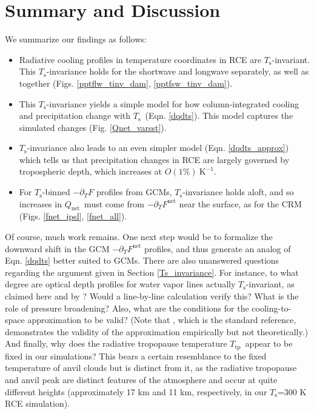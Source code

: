 \documentclass[9pt,twocolumn,twoside,lineno]{pnas-new}
\newcommand{\ppt}{\ensuremath{\partial_T}}
\newcommand{\Qnet}{\ensuremath{Q_\mathrm{net}}}
\newcommand{\Fnet}{\ensuremath{F^\mathrm{net}}}
\newcommand{\Kinverse}{\ensuremath{\mathrm{K^{-1}}}}
\newcommand{\Ts}{\ensuremath{T_\mathrm{s}}}
\newcommand{\Ttp}{\ensuremath{T_\mathrm{tp}}}
\begin{document}
\section{Summary and Discussion}
\label{sec_summary}
We summarize our findings as follows:
	\begin{itemize}
		\item Radiative cooling profiles in temperature coordinates in RCE are  \Ts-invariant. This \Ts-invariance holds for the shortwave and longwave separately, as well as together (Figs. \ref{pptflw_tinv_dam}, \ref{pptfsw_tinv_dam}).
		\item This \Ts-invariance yields a simple model for how column-integrated cooling and  precipitation change with \Ts\ (Eqn. \ref{dqdts}). This model captures the simulated changes (Fig. \ref{Qnet_varsst}).
		\item \Ts-invariance also leads to an even simpler model (Eqn. \ref{dqdts_approx}) which tells us that precipitation changes in RCE are largely governed by tropospheric depth, which increases at $O(1\%)\ \Kinverse$.
		\item For \Ts-binned $-\ppt F$ profiles from GCMs, \Ts-invariance holds aloft, and so increases in \Qnet\ must come from $-\ppt\Fnet$ near the surface, as for the CRM (Figs. \ref{fnet_ipsl}, \ref{fnet_all}).
	\end{itemize}
		
 Of course, much work remains. One next step would be to formalize the downward shift in the GCM $-\ppt\Fnet$ profiles, and thus generate an analog of Eqn. \ref{dqdts} better suited to GCMs. There are also unanswered questions regarding the  argument given in Section \ref{Ts_invariance}. For instance, to what degree are optical depth profiles for water vapor lines actually \Ts-invariant, as claimed here and by \cite{ingram2010}? Would a line-by-line calculation verify this? What is the role of pressure broadening? Also, what are the conditions for the cooling-to-space approximation to be valid? (Note that \cite{rodgers1966}, which is the standard reference, demonstrates the validity of the approximation empirically but not theoretically.) And finally, why does  the radiative tropopause temperature \Ttp\ appear to be fixed in our simulations? This bears a certain resemblance to the fixed temperature of anvil clouds  but is distinct from it, as the radiative tropopause and anvil peak are distinct features of the atmosphere and occur at quite different heights (approximately 17 km and 11 km, respectively, in our \Ts=300 K RCE simulation).
\end{document}
